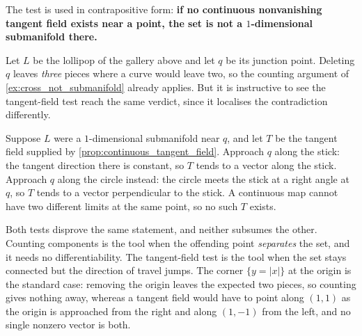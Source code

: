 The test is used in contrapositive form: \textbf{if no continuous nonvanishing tangent field
exists near a point, the set is not a $1$-dimensional submanifold there.}

\begin{aiexample}
\label{ex:lollipop_tangent_field}
Let $L$ be the lollipop of the gallery above and let $q$ be its junction point. Deleting $q$
leaves \emph{three} pieces where a curve would leave two, so the counting argument of
\cref{ex:cross_not_submanifold} already applies. But it is instructive to see the tangent-field
test reach the same verdict, since it localises the contradiction differently.

Suppose $L$ were a $1$-dimensional submanifold near $q$, and let $T$ be the tangent field
supplied by \cref{prop:continuous_tangent_field}. Approach $q$ along the stick: the tangent
direction there is constant, so $T$ tends to a vector along the stick. Approach $q$ along the
circle instead: the circle meets the stick at a right angle at $q$, so $T$ tends to a vector
perpendicular to the stick. A continuous map cannot have two different limits at the same point,
so no such $T$ exists.

\begin{remark}
Both tests disprove the same statement, and neither subsumes the other.
Counting components is the tool when the offending point \emph{separates} the set, and it needs
no differentiability. The tangent-field test is the tool when the set stays connected but the
direction of travel jumps. The corner $\{y = \lvert x\rvert\}$ at the origin is the standard
case: removing the origin leaves the expected two pieces, so counting gives nothing away, whereas
a tangent field would have to point along $(1,1)$ as the origin is approached from the right and
along $(1,-1)$ from the left, and no single nonzero vector is both.
\end{remark}
\end{aiexample}

